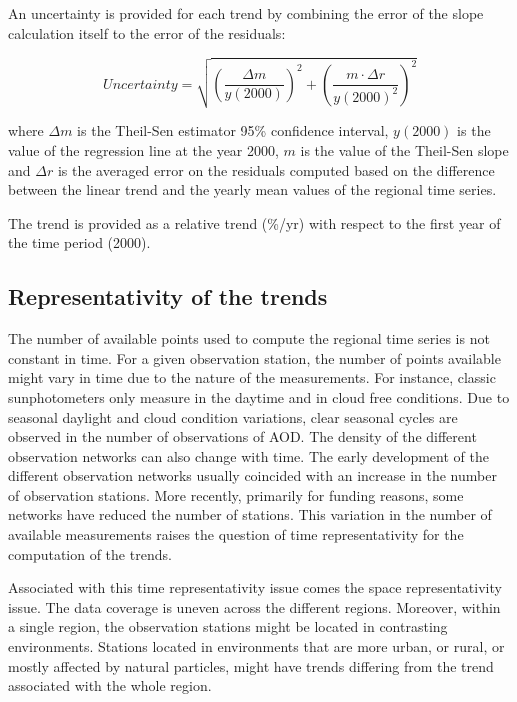 \documentclass[acp, manuscript]{copernicus}
\begin{document}
An uncertainty is provided for each trend by combining the error of the slope calculation itself to the error of the residuals:

\begin{equation}
 Uncertainty = \sqrt{{\left (\frac{\Delta m}{y(2000)}\right )}^{2} + {\left ( \frac{m \cdot \Delta r}{y(2000)^2}\right )}^{2} }
\end{equation}

where $\Delta m$ is the Theil-Sen estimator 95\% confidence interval, $y(2000)$ is the value of the regression line at the year 2000, $m$ is the value of the Theil-Sen slope and $\Delta r$ is the averaged error on the residuals computed based on the difference between the linear trend and the yearly mean values of the regional time series.

The trend is provided as a relative trend (\%/yr) with respect to the first year of the time period (2000).

\subsection{Representativity of the trends}
The number of available points used to compute the regional time series is not constant in time. For a given observation station, the number of points available might vary in time due to the nature of the measurements. For instance, classic sunphotometers only measure in the daytime and in cloud free conditions. Due to seasonal daylight and cloud condition variations, clear seasonal cycles are observed in the number of observations of AOD. The density of the different observation networks can also change with time. The early development of the different observation networks usually coincided with an increase in the number of observation stations. More recently, primarily for funding reasons, some networks have reduced the number of stations. This variation in the number of available measurements raises the question of time representativity for the computation of the trends.

Associated with this time representativity issue comes the space representativity issue. The data coverage is uneven across the different regions. Moreover, within a single region, the observation stations might be located in contrasting environments. Stations located in environments that are more urban, or rural, or mostly affected by natural particles, might have trends differing from the trend associated with the whole region.
\end{document}
